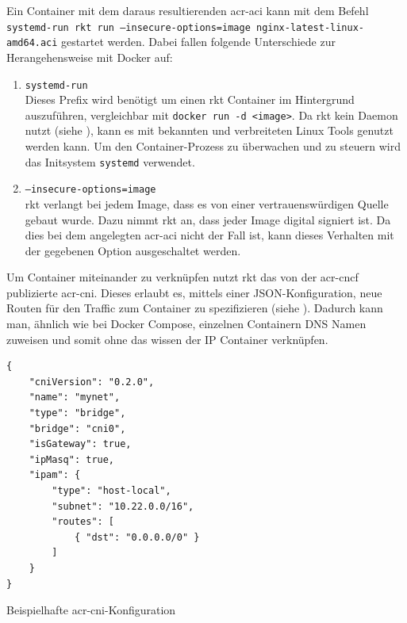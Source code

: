 Ein Container mit dem daraus resultierenden \gls{acr-aci} kann mit dem Befehl \texttt{systemd-run rkt run --insecure-options=image nginx-latest-linux-amd64.aci} gestartet werden. Dabei fallen folgende Unterschiede zur Herangehensweise mit Docker auf:
\begin{enumerate}
	\item \texttt{systemd-run} \\ 
	Dieses Prefix wird benötigt um einen rkt Container im Hintergrund auszuführen, vergleichbar mit \texttt{docker run -d <image>}. Da rkt kein Daemon nutzt (siehe ), kann es mit bekannten und verbreiteten Linux Tools genutzt werden kann. Um den Container-Prozess zu überwachen und zu steuern wird das Initsystem \texttt{systemd} verwendet.
	\item \texttt{--insecure-options=image} \\
	rkt verlangt bei jedem Image, dass es von einer vertrauenswürdigen Quelle gebaut wurde. Dazu nimmt rkt an, dass jeder Image digital signiert ist. Da dies bei dem angelegten \gls{acr-aci} nicht der Fall ist, kann dieses Verhalten mit der gegebenen Option ausgeschaltet werden.
\end{enumerate}

Um Container miteinander zu verknüpfen nutzt rkt das von der \gls{acr-cncf} publizierte \gls{acr-cni}. Dieses erlaubt es, mittels einer JSON-Konfiguration, neue Routen für den Traffic zum Container zu spezifizieren (siehe ). Dadurch kann man, ähnlich wie bei Docker Compose, einzelnen Containern DNS Namen zuweisen und somit ohne das wissen der IP Container verknüpfen.

\begin{listing}[h]
	\begin{verbatim}
{
	"cniVersion": "0.2.0",
	"name": "mynet",
	"type": "bridge",
	"bridge": "cni0",
	"isGateway": true,
	"ipMasq": true,
	"ipam": {
		"type": "host-local",
		"subnet": "10.22.0.0/16",
		"routes": [
			{ "dst": "0.0.0.0/0" }
		]
	}
}
	\end{verbatim}
	\caption{Beispielhafte \gls{acr-cni}-Konfiguration}
	\label{lst:cniConfig}
\end{listing}

